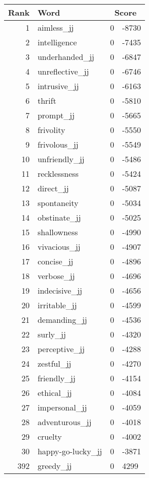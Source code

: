 \begin{longtable}[!htbp]{| rlr@{.}l |}
    \hline
    \textbf{Rank} & \textbf{Word} & \multicolumn{2}{c|}{\textbf{Score}} \\
    \hline
    \endhead
    1 & aimless\_jj & 0 & -8730 \\
    2 & intelligence & 0 & -7435 \\
    3 & underhanded\_jj & 0 & -6847 \\
    4 & unreflective\_jj & 0 & -6746 \\
    5 & intrusive\_jj & 0 & -6163 \\
    6 & thrift & 0 & -5810 \\
    7 & prompt\_jj & 0 & -5665 \\
    8 & frivolity & 0 & -5550 \\
    9 & frivolous\_jj & 0 & -5549 \\
    10 & unfriendly\_jj & 0 & -5486 \\
    11 & recklessness & 0 & -5424 \\
    12 & direct\_jj & 0 & -5087 \\
    13 & spontaneity & 0 & -5034 \\
    14 & obstinate\_jj & 0 & -5025 \\
    15 & shallowness & 0 & -4990 \\
    16 & vivacious\_jj & 0 & -4907 \\
    17 & concise\_jj & 0 & -4896 \\
    18 & verbose\_jj & 0 & -4696 \\
    19 & indecisive\_jj & 0 & -4656 \\
    20 & irritable\_jj & 0 & -4599 \\
    21 & demanding\_jj & 0 & -4536 \\
    22 & surly\_jj & 0 & -4320 \\
    23 & perceptive\_jj & 0 & -4288 \\
    24 & zestful\_jj & 0 & -4270 \\
    25 & friendly\_jj & 0 & -4154 \\
    26 & ethical\_jj & 0 & -4084 \\
    27 & impersonal\_jj & 0 & -4059 \\
    28 & adventurous\_jj & 0 & -4018 \\
    29 & cruelty & 0 & -4002 \\
    30 & happy-go-lucky\_jj & 0 & -3871 \\
    392 & greedy\_jj & 0 & 4299 \\

\end{longtable}
